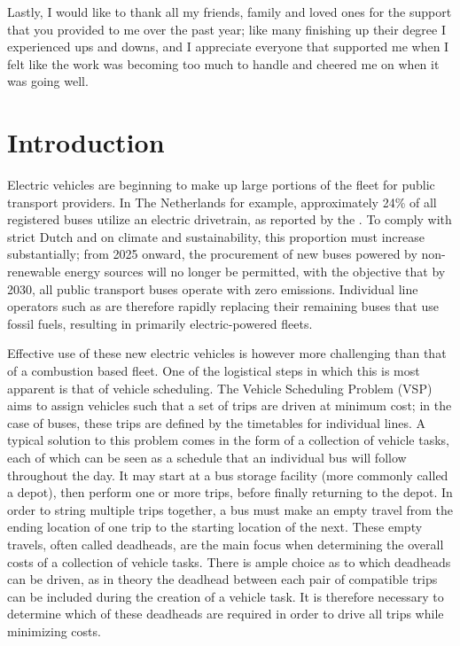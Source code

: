 \documentclass[]{article}
\begin{document}
Lastly, I would like to thank all my friends, family and loved ones for the support that you provided to me over the past year; like many finishing up their degree I experienced ups and downs, and I appreciate everyone that supported me when I felt like the work was becoming too much to handle and cheered me on when it was going well.

\newpage
\tableofcontents
\newpage

\section{Introduction}
Electric vehicles are beginning to make up large portions of the fleet for public transport providers. In The Netherlands for example, approximately 24\% of all registered buses utilize an electric drivetrain, as reported by the \citet{RDW}. To comply with strict Dutch and \citet{europaRegulation20181999} on climate and sustainability, this proportion must increase substantially; from 2025 onward, the procurement of new buses powered by non-renewable energy sources will no longer be permitted, with the objective that by 2030, all public transport buses operate with zero emissions. Individual line operators such as \citet{qbuzzQbuzz} are therefore rapidly replacing their remaining buses that use fossil fuels, resulting in primarily electric-powered fleets.

Effective use of these new electric vehicles is however more challenging than that of a combustion based fleet. One of the logistical steps in which this is most apparent is that of vehicle scheduling. The Vehicle Scheduling Problem (VSP) aims to assign vehicles such that a set of trips are driven at minimum cost; in the case of buses, these trips are defined by the timetables for individual lines. A typical solution to this problem comes in the form of a collection of vehicle tasks, each of which can be seen as a schedule that an individual bus will follow throughout the day. It may start at a bus storage facility (more commonly called a depot), then perform one or more trips, before finally returning to the depot. In order to string multiple trips together, a bus must make an empty travel from the ending location of one trip to the starting location of the next. These empty travels, often called deadheads, are the main focus when determining the overall costs of a collection of vehicle tasks. There is ample choice as to which deadheads can be driven, as in theory the deadhead between each pair of compatible trips can be included during the creation of a vehicle task. It is therefore necessary to determine which of these deadheads are required in order to drive all trips while minimizing costs.
\end{document}
